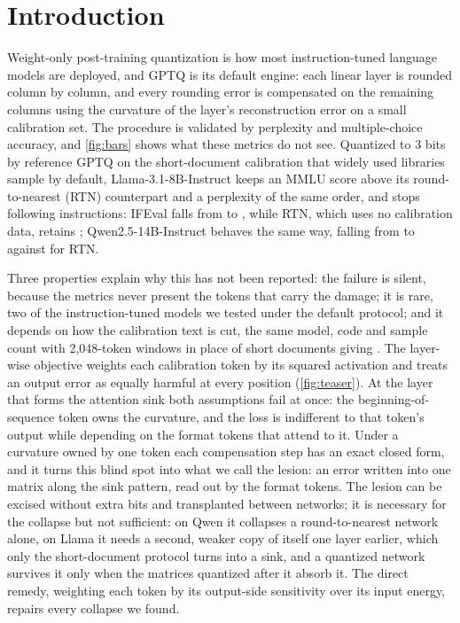 \section{Introduction}
\label{sec:intro}
Weight-only post-training quantization is how most instruction-tuned language models are deployed, and GPTQ \citep{frantar2023gptq} is its default engine: each linear layer is rounded column by column, and every rounding error is compensated on the remaining columns using the curvature of the layer's reconstruction error on a small calibration set.
The procedure is validated by perplexity and multiple-choice accuracy, and \cref{fig:bars} shows what these metrics do not see.
Quantized to 3 bits by reference GPTQ on the short-document calibration that widely used libraries sample by default, Llama-3.1-8B-Instruct keeps an MMLU score above its round-to-nearest (RTN) counterpart and a perplexity of the same order, and stops following instructions: IFEval falls from \LfpIF{} to \LgptqIF{}, while RTN, which uses no calibration data, retains \LrtnIF{}; Qwen2.5-14B-Instruct behaves the same way, falling from \QfpIF{} to \QgptqIF{} against \QrtnIF{} for RTN.

Three properties explain why this has not been reported: the failure is silent, because the metrics never present the tokens that carry the damage; it is rare, two of the \nCensus{} instruction-tuned models we tested under the default protocol; and it depends on how the calibration text is cut, the same model, code and sample count with 2,048-token windows in place of short documents giving \LcwinIF{}.
The layer-wise objective weights each calibration token by its squared activation and treats an output error as equally harmful at every position (\cref{fig:teaser}).
At the layer that forms the attention sink both assumptions fail at once: the beginning-of-sequence token owns the curvature, and the loss is indifferent to that token's output while depending on the format tokens that attend to it.
Under a curvature owned by one token each compensation step has an exact closed form, and it turns this blind spot into what we call the lesion: an error written into one matrix along the sink pattern, read out by the format tokens.
The lesion can be excised without extra bits and transplanted between networks; it is necessary for the collapse but not sufficient: on Qwen it collapses a round-to-nearest network alone, on Llama it needs a second, weaker copy of itself one layer earlier, which only the short-document protocol turns into a sink, and a quantized network survives it only when the matrices quantized after it absorb it.
The direct remedy, weighting each token by its output-side sensitivity over its input energy, repairs every collapse we found.

